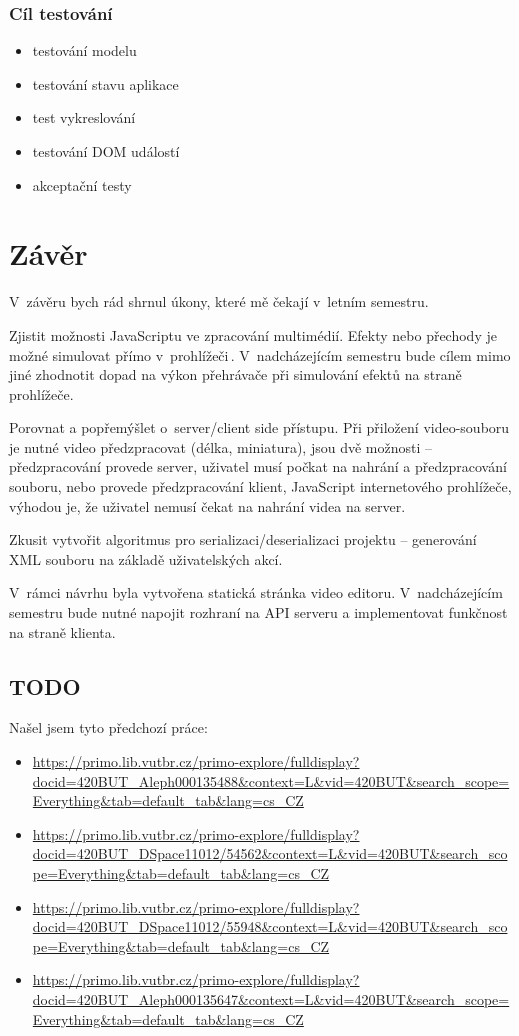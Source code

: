 \subsection{Cíl testování}
\begin{itemize}
\item testování modelu
\item testování stavu aplikace
\item test vykreslování
\item testování DOM událostí
\item akceptační testy
\end{itemize}
\cite{Mastering_TypeScript}

\chapter{Závěr}
V~závěru bych rád shrnul úkony, které mě čekají v~letním semestru.

Zjistit možnosti JavaScriptu ve zpracování multimédií. Efekty nebo přechody je možné simulovat přímo v~prohlížeči\,\cite{ManipulatingVideo}. V~nadcházejícím semestru bude cílem mimo jiné zhodnotit dopad na výkon přehrávače při simulování efektů na straně prohlížeče.

Porovnat a popřemýšlet o~server/client side přístupu. Při přiložení video-souboru je nutné video předzpracovat (délka, miniatura), jsou dvě možnosti -- předzpracování provede server, uživatel musí počkat na nahrání a předzpracování souboru, nebo provede předzpracování klient, JavaScript internetového prohlížeče, výhodou je, že uživatel nemusí čekat na nahrání videa na server.

Zkusit vytvořit algoritmus pro serializaci/deserializaci projektu -- generování XML souboru na základě uživatelských akcí.

V~rámci návrhu byla vytvořena statická stránka video editoru. V~nadcházejícím semestru bude nutné napojit rozhraní na API serveru a implementovat funkčnost na straně klienta.

\section{TODO}
Našel jsem tyto předchozí práce:\\
\begin{itemize}
\item \url{https://primo.lib.vutbr.cz/primo-explore/fulldisplay?docid=420BUT_Aleph000135488&context=L&vid=420BUT&search_scope=Everything&tab=default_tab&lang=cs_CZ}
\item \url{https://primo.lib.vutbr.cz/primo-explore/fulldisplay?docid=420BUT_DSpace11012/54562&context=L&vid=420BUT&search_scope=Everything&tab=default_tab&lang=cs_CZ}
\item \url{https://primo.lib.vutbr.cz/primo-explore/fulldisplay?docid=420BUT_DSpace11012/55948&context=L&vid=420BUT&search_scope=Everything&tab=default_tab&lang=cs_CZ}
\item \url{https://primo.lib.vutbr.cz/primo-explore/fulldisplay?docid=420BUT_Aleph000135647&context=L&vid=420BUT&search_scope=Everything&tab=default_tab&lang=cs_CZ}
\end{itemize}


